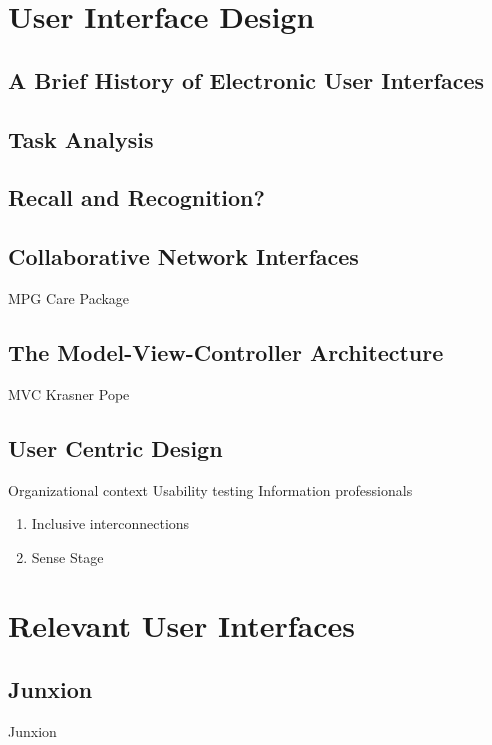 \section{User Interface Design}

\subsection{A Brief History of Electronic User Interfaces}
\subsection{Task Analysis}
\subsection{Recall and Recognition?}
\subsection{Collaborative Network Interfaces}
	MPG Care Package 
\subsection{The Model-View-Controller Architecture}
	MVC Krasner Pope 
\subsection{User Centric Design}
	Organizational context 
	Usability testing 
	Information professionals 
\begin{enumerate}
	\item Inclusive interconnections 
	\item Sense Stage 
\end{enumerate}

\section{Relevant User Interfaces}

\subsection{Junxion}
	Junxion 
